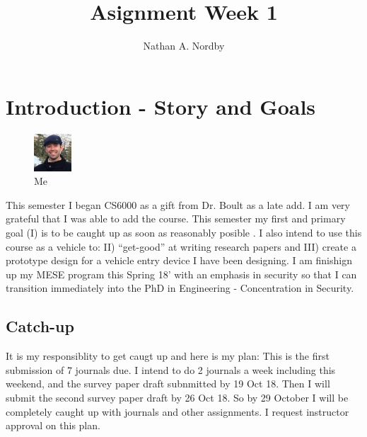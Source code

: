 \documentclass[conference]{journal}
\title{Asignment Week 1}
\author{Nathan A. Nordby}
\begin{document}
\maketitle





\section{Introduction - Story and Goals}


\begin{figure}
\centering
\includegraphics[width=0.125\textwidth]{Nathan.jpg}
\caption{\label{fig:Me} Me}
\end{figure}

	This semester I began CS6000 as a gift from Dr. Boult as a late add. I am very grateful that I was able to add the course. This semester my first and primary goal (I) is to be caught up as soon as reasonably posible . I also intend to use this course as a vehicle to: II) “get-good” at writing research papers and III) create a prototype design for a vehicle entry device I have been designing.  I am finishign up my MESE program this Spring 18' with an emphasis in security so that I can transition immediately into the PhD in Engineering - Concentration in Security.

\subsection{Catch-up}
It is my responsiblity to get caugt up and here is my plan: This is the first submission of 7 journals due. I intend to do 2 journals a week including this weekend, and the survey paper draft subnmitted by 19 Oct 18. Then I will submit the second survey paper draft by 26 Oct 18. So by 29 October I will be completely caught up with journals and other assignments.  I request instructor approval on this plan.
\end{document}

